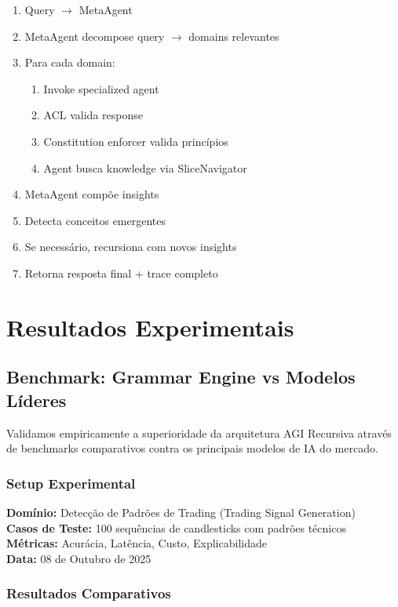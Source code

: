 \documentclass[11pt]{article}
\begin{document}
\begin{enumerate}
    \item Query $\rightarrow$ MetaAgent
    \item MetaAgent decompose query $\rightarrow$ domains relevantes
    \item Para cada domain:
    \begin{enumerate}
        \item Invoke specialized agent
        \item ACL valida response
        \item Constitution enforcer valida princípios
        \item Agent busca knowledge via SliceNavigator
    \end{enumerate}
    \item MetaAgent compõe insights
    \item Detecta conceitos emergentes
    \item Se necessário, recursiona com novos insights
    \item Retorna resposta final + trace completo
\end{enumerate}

\section{Resultados Experimentais}

\subsection{Benchmark: Grammar Engine vs Modelos Líderes}

Validamos empiricamente a superioridade da arquitetura AGI Recursiva através de benchmarks comparativos contra os principais modelos de IA do mercado.

\subsubsection{Setup Experimental}

\textbf{Domínio:} Detecção de Padrões de Trading (Trading Signal Generation)\\
\textbf{Casos de Teste:} 100 sequências de candlesticks com padrões técnicos\\
\textbf{Métricas:} Acurácia, Latência, Custo, Explicabilidade\\
\textbf{Data:} 08 de Outubro de 2025

\subsubsection{Resultados Comparativos}
\end{document}

